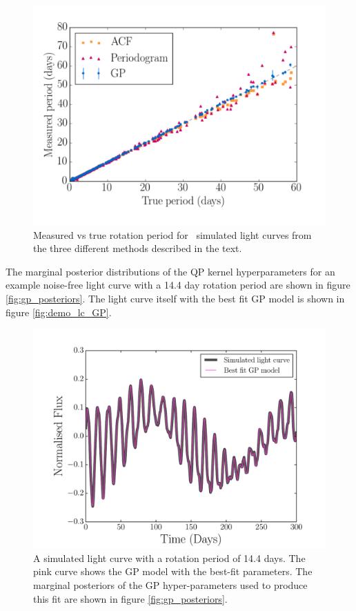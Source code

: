 \begin{figure}
\begin{center}
\includegraphics[width=6in, clip=true]{figures/compare2.pdf}
\caption[All results.]
{Measured vs true rotation period for \nlightcurves\ simulated light
curves from the three different methods described in the text.}
\end{center}
\end{figure}
\label{fig:compare_noise_free}

The marginal posterior distributions of the QP kernel hyperparameters for an
example noise-free light curve  with a 14.4 day rotation period are shown in
figure \ref{fig:gp_posteriors}.
The light curve itself with the best fit GP model is shown in figure
\ref{fig:demo_lc_GP}.

\begin{figure}
\begin{center}
\includegraphics[width=6in, clip=true]{figures/demo_lc_GP.pdf}
\caption{A simulated light curve with a rotation period of 14.4 days.
The pink curve shows the GP model with the best-fit parameters.
The marginal posteriors of the GP hyper-parameters used to produce this fit
are shown in figure \ref{fig:gp_posteriors}.}
\end{center}
\end{figure}
\label{fig:demo_lc_GP}

